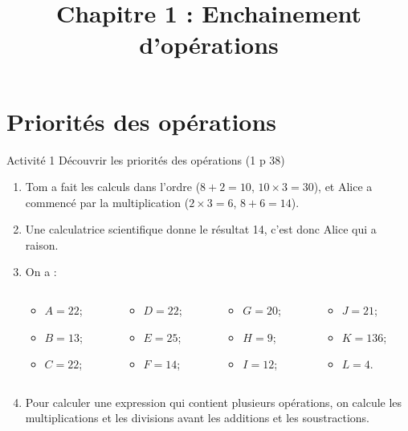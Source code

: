 \documentclass[xcolor={dvipsnames}]{beamer}
\title{Chapitre 1 : Enchainement d'opérations}
\newcommand{\myitem}{\item[\textbullet]}
\begin{document}
\begin{frame}
  \titlepage 
\end{frame}


	



\section{Priorités des opérations}




\begin{frame}{}

	\begin{block}{Activité 1 Découvrir les priorités des opérations (1 p 38)}
		\begin{enumerate}\pause
			\item Tom a fait les calculs dans l'ordre ($8 + 2 = 10$, $10 \times 3 = 30$), et Alice a commencé par la multiplication ($2 \times 3 = 6$, $8 + 6 = 14$).\pause
			
			\item Une calculatrice scientifique donne le résultat 14, c'est donc Alice qui a raison.\pause
			
			\item On a :\pause
			\begin{columns}
				\begin{column}{0.25\textwidth}
					\begin{itemize}
						\myitem $A = 22 $;\pause
						\myitem $B = 13 $;\pause
						\myitem $C = 22 $;\pause
					\end{itemize}
				\end{column}
				\begin{column}{0.25\textwidth}
					\begin{itemize}
						\myitem $D = 22 $;\pause
						\myitem $E = 25 $;\pause
						\myitem $F = 14 $;\pause
					\end{itemize}
				\end{column}
				\begin{column}{0.25\textwidth}
					\begin{itemize}
						\myitem $G = 20 $;\pause
						\myitem $H = 9 $;\pause
						\myitem $I = 12 $;\pause
					\end{itemize}
				\end{column}
				\begin{column}{0.25\textwidth}
					\begin{itemize}
						\myitem $J = 21 $;\pause
						\myitem $K = 136 $;\pause
						\myitem $L = 4 $.
					\end{itemize}
				\end{column}
			\end{columns}
			
			\item Pour calculer une expression qui contient plusieurs opérations, on calcule les multiplications et les divisions avant les additions et les soustractions.
		\end{enumerate}
	\end{block}
\end{frame}
\end{document}
